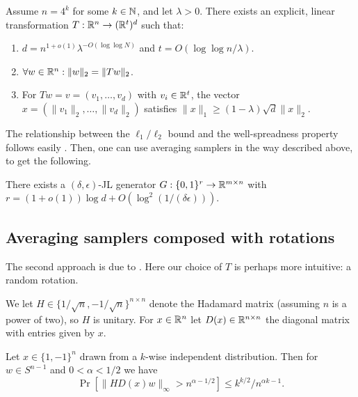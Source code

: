 \begin{lemma}
  Assume $n=4^k$ for some $k\in\mathbb{N}$, and let $\lambda>0$. There exists
  an explicit, linear transformation $T:\mathbb{R}^n\to (\mathbb{R}^t)^d$ such that:
  \begin{enumerate}
  \item $d=n^{1+o(1)}\lambda^{-O(\log\log N)}$ and $t=O(\log\log
    n/\lambda)$.
  \item $\forall w\in\mathbb{R}^n:\|w\|_2=\|Tw\|_2$.
  \item For $Tw=v=(v_1,\ldots,v_d)$ with $v_i\in\mathbb{R}^t$, the vector
    $x=(\|v_1\|_2,\ldots,\|v_d\|_2)$ satisfies $\|x\|_1\ge
    (1-\lambda)\sqrt{d} \|x\|_2$.
  \end{enumerate}
\end{lemma}

The relationship between the $\ell_1/\ell_2$ bound and the
well-spreadness property follows easily \cite[Lemma
  III.5]{indyk2007uncertainty}. Then, one can use averaging samplers
in the way described above, to get the following.

\begin{theorem}
  There exists a $(\delta,\epsilon)$-JL generator
  $G:\{0,1\}^r\to\mathbb{R}^{m\times n}$ with $r = (1+o(1))\log d +
  O(\log^2(1/(\delta\epsilon)))$.
\end{theorem}


\subsection{Averaging samplers composed with rotations}

The second approach is due to \cite{kane-2011}. Here our choice of $T$
is perhaps more intuitive: a random rotation.

\begin{notation}
  We let $H \in \{1/\sqrt{n}, -1/\sqrt{n}\}^{n \times n}$ denote the
  Hadamard matrix (assuming $n$ is a power of two), so $H$ is
  unitary. For $x \in \mathbb{R}^n$ let $D(x) \in \mathbb{R}^{n \times n}$ the
  diagonal matrix with entries given by $x$.
\end{notation}

\begin{lemma}
  \label{rotation}
  Let $x \in \{1,-1\}^n$ drawn from a $k$-wise independent
  distribution. Then for $w \in S^{n-1}$ and $0 < \alpha < 1/2$ we
  have
  \[
  \Pr[\|HD(x)w\|_\infty > n^{\alpha-1/2}] \le k^{k/2}/n^{\alpha k -1}.
  \]
\end{lemma}

